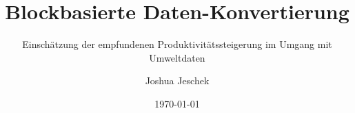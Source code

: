 \newcommand{\organization}{
    Technische Universität Chemnitz \\
    Fakultät Informatik \\
    Professur Medieninformatik \\
}
\newcommand{\thesistype}{Bachelorarbeit}
\newcommand{\degree}{Bachelor of Science}
\newcommand{\theauthor}{Joshua Jeschek}
\newcommand{\thetitle}{Blockbasierte Daten-Konvertierung}
\newcommand{\thesubtitle}{Einschätzung der empfundenen Produktivitätssteigerung im Umgang mit Umweltdaten}
\newcommand{\erstpruefer}{Dr. Thomas Wilhelm-Stein}
\newcommand{\zweitpruefer}{Dr. Werner Koch}
\newcommand{\place}{Chemnitz}
\date{\today{}}

\author{\theauthor}
\title{\thetitle}
\subtitle{\thesubtitle}
